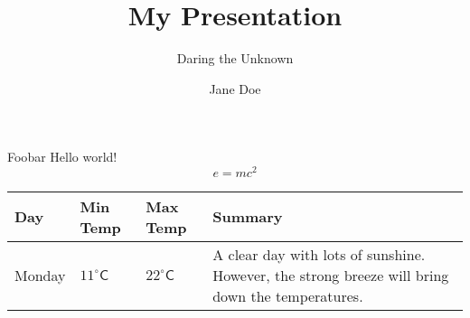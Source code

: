 \documentclass[dvipdfmx]{beamer}
\begin{document}
  \title{My Presentation}
  \subtitle{Daring the Unknown}
  \author{Jane Doe}
  \frame{\maketitle}

  \begin{frame}{Foo}{bar}
    Hello world!
    \begin{equation}
      \tag{Mass--energy equivalence} e=mc^2
    \end{equation}
    \begin{center}
      \begin{tabularx}{\textwidth}{lllX}
      \toprule
      Day & Min Temp & Max Temp & Summary \\
      \midrule
      Monday & $11^{\circ}\mathsf{C}$ & $22^\circ\mathsf{C}$ & A
      clear day with lots of sunshine. However, the strong breeze
      will bring down the temperatures. \\
      \bottomrule
      \end{tabularx}
    \end{center}
  \end{frame}
\end{document}
